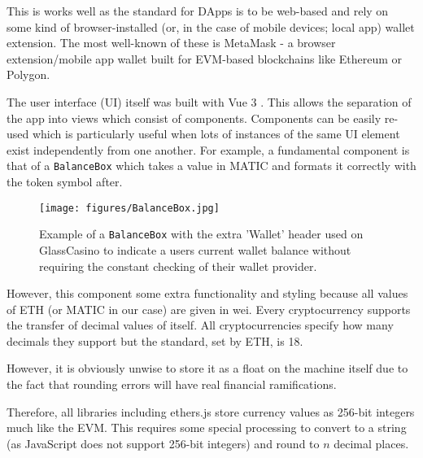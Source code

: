 \documentclass[10pt,journal,compsoc]{IEEEtran}
\begin{document}
This is works well as the standard for DApps is to be web-based and rely on some kind of browser-installed (or, in the case of mobile devices; local app) wallet extension. The most well-known of these is MetaMask \cite{metamask:_the_crypto_wallet_gateway_to_web3_blockchain_apps} - a browser extension/mobile app wallet built for EVM-based blockchains like Ethereum or Polygon. 

The user interface (UI) itself was built with Vue 3 \cite{vue}. This allows the separation of the app into views which consist of components. Components can be easily re-used which is particularly useful when lots of instances of the same UI element exist independently from one another. For example, a fundamental component is that of a \texttt{BalanceBox} which takes a value in MATIC and formats it correctly with the token symbol after.

\begin{figure}[!h]
    \centering
    \texttt{[image: figures/BalanceBox.jpg]}
    \caption{Example of a \texttt{BalanceBox} with the extra 'Wallet' header used on GlassCasino to indicate a users current wallet balance without requiring the constant checking of their wallet provider.}
    \label{fig:balancebox}
\end{figure}

However, this component some extra functionality and styling because all values of ETH (or MATIC in our case) are given in wei. Every cryptocurrency supports the transfer of decimal values of itself. All cryptocurrencies specify how many decimals they support but the standard, set by ETH, is 18. 

However, it is obviously unwise to store it as a float on the machine itself due to the fact that rounding errors will have real financial ramifications.

Therefore, all libraries including ethers.js store currency values as 256-bit integers much like the EVM. This requires some special processing to convert to a string (as JavaScript does not support 256-bit integers) and round to $n$ decimal places.
\end{document}
